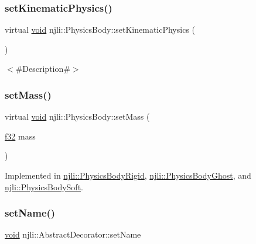 \subsubsection{\texorpdfstring{set\+Kinematic\+Physics()}{setKinematicPhysics()}}
{\footnotesize\ttfamily virtual \mbox{\hyperlink{_thread_8h_af1e856da2e658414cb2456cb6f7ebc66}{void}} njli\+::\+Physics\+Body\+::set\+Kinematic\+Physics (\begin{DoxyParamCaption}{ }\end{DoxyParamCaption})\hspace{0.3cm}{\ttfamily [virtual]}}

$<$\#\+Description\#$>$ \mbox{\label{classnjli_1_1_physics_body_a2418ec20e73cfe304bac23e306daebcd}} 
\subsubsection{\texorpdfstring{set\+Mass()}{setMass()}}
{\footnotesize\ttfamily virtual \mbox{\hyperlink{_thread_8h_af1e856da2e658414cb2456cb6f7ebc66}{void}} njli\+::\+Physics\+Body\+::set\+Mass (\begin{DoxyParamCaption}\item[{\mbox{\hyperlink{_util_8h_a5f6906312a689f27d70e9d086649d3fd}{f32}}}]{mass }\end{DoxyParamCaption})\hspace{0.3cm}{\ttfamily [pure virtual]}}



Implemented in \mbox{\hyperlink{classnjli_1_1_physics_body_rigid_a1c8b45c013666e4cd575fc6e3c6db031}{njli\+::\+Physics\+Body\+Rigid}}, \mbox{\hyperlink{classnjli_1_1_physics_body_ghost_a1edc30655aa0495dbf60c59138cb52e2}{njli\+::\+Physics\+Body\+Ghost}}, and \mbox{\hyperlink{classnjli_1_1_physics_body_soft_a23766e4c1a649a93680f37592cd56060}{njli\+::\+Physics\+Body\+Soft}}.

\mbox{\label{classnjli_1_1_physics_body_a087eb5f8d9f51cc476f12f1d10a3cb95}} 
\subsubsection{\texorpdfstring{set\+Name()}{setName()}}
{\footnotesize\ttfamily \mbox{\hyperlink{_thread_8h_af1e856da2e658414cb2456cb6f7ebc66}{void}} njli\+::\+Abstract\+Decorator\+::set\+Name}

